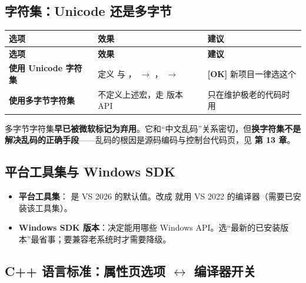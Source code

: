 \subsection{字符集：Unicode 还是多字节}

\begin{longtable}{L{3.6cm}L{8.0cm}L{2.8cm}}
\toprule
\textbf{选项} & \textbf{效果} & \textbf{建议} \\
\midrule
\endfirsthead
\toprule
\textbf{选项} & \textbf{效果} & \textbf{建议} \\
\midrule
\endhead
\bottomrule
\endlastfoot
\textbf{使用 Unicode 字符集} & 定义  与 ， $\rightarrow$ ， $\rightarrow$  & \textbf{[OK]} 新项目一律选这个 \\
\textbf{使用多字节字符集} & 不定义上述宏，走  版本 API & 只在维护极老的代码时用 \\
\end{longtable}

\begin{warnbox}[注意]
多字节字符集\textbf{早已被微软标记为弃用}。它和“中文乱码”关系密切，但\textbf{换字符集不是解决乱码的正确手段}——乱码的根因是源码编码与控制台代码页，见 \textbf{第 13 章}。
\end{warnbox}

\subsection{平台工具集与 Windows SDK}

\begin{itemize}
  \item \textbf{平台工具集}： 是 VS 2026 的默认值。改成  就用 VS 2022 的编译器（需要已安装该工具集）。
  \item \textbf{Windows SDK 版本}：决定能用哪些 Windows API。选“最新的已安装版本”最省事；要兼容老系统时才需要降级。
\end{itemize}

\subsection{C++ 语言标准：属性页选项 $\leftrightarrow$ 编译器开关}

